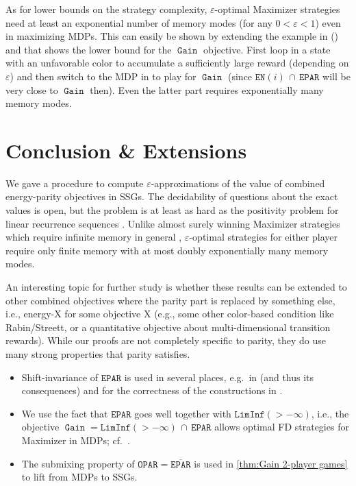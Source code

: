 \documentclass[a4paper,UKenglish,cleveref,autoref,thm-restate]{lipics-v2021}
\DeclareMathOperator{\Gain}{\mathtt{Gain}}
\newcommand{\Eparity}{\mathtt{EPAR}}
\newcommand{\Oparity}{\mathtt{OPAR}}
\newcommand{\LimInf}[2]{\mathtt{LimInf}(#1 #2)}
\newcommand{\en}{\mathtt{EN}}
\newcommand{\+}[1]{\mathbb{#1}}
\newcommand{\?}[1]{\mathcal{#1}}
\newcommand{\eps}{\varepsilon}
\newcommand{\complementof}[1]{\overline{#1}}
\begin{document}
As for lower bounds on the strategy complexity, 
$\eps$-optimal Maximizer strategies need at least an exponential number of
memory modes (for any $0 < \eps < 1$) even in maximizing MDPs.
This can easily be shown by extending the example in
() and
\cite[Fig.~1 and Prop.~4]{Gimbert2011ComputingOS}
that shows the lower bound for the $\Gain$ objective.
First loop in a state with an unfavorable color to accumulate a
sufficiently large reward (depending on $\eps$) and then switch to the MDP in 
\cite[Fig.~1 and Prop.~4]{Gimbert2011ComputingOS} to play for $\Gain$
(since $\en(i)\,\cap\, \Eparity$ will be very close to $\Gain$ then).
Even the latter part requires exponentially many memory modes.


\section{Conclusion \& Extensions}\label{sec:conclusion}

We gave a procedure to compute $\eps$-approximations of the value of combined
energy-parity objectives in SSGs.
The decidability of questions about the exact values is open, but the problem
is at least as hard as the positivity problem for linear recurrence sequences
\cite[Section 5.2.3]{Piribauer:2021}.
%
Unlike almost surely winning Maximizer strategies which
require infinite memory in general \cite{MSTW2017,MSTW2021},
$\eps$-optimal strategies for either player require only finite memory
with at most doubly exponentially many memory modes.

An interesting topic for further study is whether these results can be extended
to other combined objectives where the parity part is replaced by something
else, i.e., energy-X for some objective X
(e.g., some other color-based condition like Rabin/Streett, or a quantitative
objective about multi-dimensional transition rewards).
While our proofs are not completely
specific to parity, they do use many strong properties that parity satisfies. 

\begin{itemize}
\item
  Shift-invariance of $\Eparity$ is used in several places,
  e.g.\ in  (and thus its consequences) and
  for the correctness of the constructions in .
\item
  We use the fact that $\Eparity$ goes well together with
  $\LimInf{>}{-\infty}$,
  i.e., the objective $\Gain = \LimInf{>}{-\infty}\, \cap\, \Eparity$ allows
  optimal FD strategies for Maximizer in MDPs; cf.~.
\item
  The submixing property of $\Oparity = \complementof{\Eparity}$ is used in \cref{thm:Gain 2-player games}
  to lift  from MDPs to SSGs.
\end{itemize}
\end{document}
